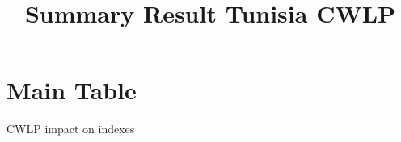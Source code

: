 \documentclass[10pt,a4paper]{article}
\begin{document}
	
	\title{Summary Result Tunisia CWLP}\maketitle
	
	\pagebreak
	
	\tableofcontents
	
	\pagebreak
	
\section{Main Table}

\begin{table}[H]\centering\caption{CWLP impact on indexes} 
	\resizebox{\textwidth}{!}{}
\end{table}
\end{document}

